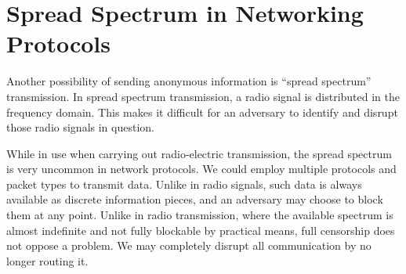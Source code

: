 \section{Spread Spectrum in Networking Protocols}
Another possibility of sending anonymous information is ``spread spectrum'' transmission. In spread spectrum transmission, a radio signal is distributed in the frequency domain. This makes it difficult for an adversary to identify and disrupt those radio signals in question. 

While in use when carrying out radio-electric transmission, the spread spectrum is very uncommon in network protocols. We could employ multiple protocols and packet types to transmit data. Unlike in radio signals, such data is always available as discrete information pieces, and an adversary may choose to block them at any point. Unlike in radio transmission, where the available spectrum is almost indefinite and not fully blockable by practical means, full censorship does not oppose a problem. We may completely disrupt all communication by no longer routing it.
